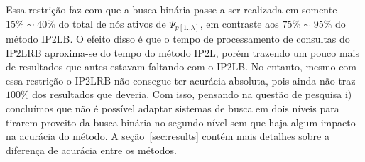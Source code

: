 Essa restrição faz com que a busca binária passe a ser realizada em somente $15\% \sim 40\%$ do total de nós ativos de $\Psi_{p[1..\lambda]}$, em contraste aos $75\% \sim 95\%$ do método IP2LB. O efeito disso é que o tempo de processamento de consultas do IP2LRB aproxima-se do tempo do método IP2L, porém trazendo um pouco mais de resultados que antes estavam faltando com o IP2LB. No entanto, mesmo com essa restrição o IP2LRB não consegue ter acurácia absoluta, pois ainda não traz $100\%$ dos resultados que deveria. Com isso, pensando na questão de pesquisa i) concluímos que não é possível adaptar sistemas de busca em dois níveis para tirarem proveito da busca binária no segundo nível sem que haja algum impacto na acurácia do método. A seção~\ref{sec:results} contém mais detalhes sobre a diferença de acurácia entre os métodos.





